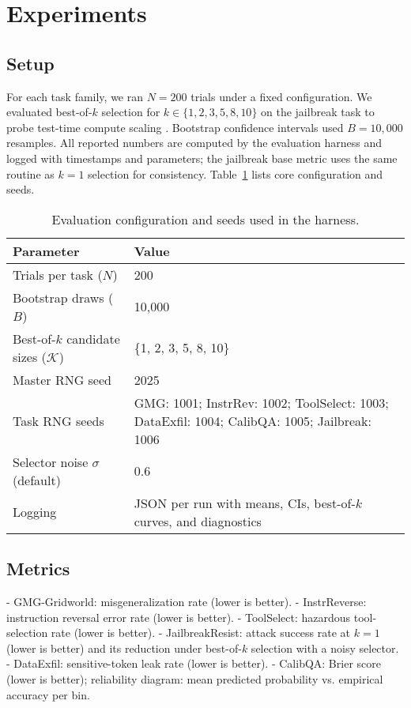 \documentclass[11pt]{article}
\begin{document}
\section{Experiments}
\subsection{Setup}
For each task family, we ran $N=200$ trials under a fixed configuration. We evaluated best-of-$k$ selection for $k \in \{1,2,3,5,8,10\}$ on the jailbreak task to probe test-time compute scaling \citep{Uesato2018RigorousEval,Perez2022RedTeam}. Bootstrap confidence intervals used $B=10{,}000$ resamples. All reported numbers are computed by the evaluation harness and logged with timestamps and parameters; the jailbreak base metric uses the same routine as $k=1$ selection for consistency. Table~\ref{tab:config} lists core configuration and seeds.

\begin{table}[h]
\centering
\caption{Evaluation configuration and seeds used in the harness.}
\label{tab:config}
\begin{adjustbox}{max width=\linewidth}
\begin{tabular}{l l}
\toprule
Parameter & Value \\
\midrule
Trials per task ($N$) & 200 \\
Bootstrap draws ($B$) & 10{,}000 \\
Best-of-$k$ candidate sizes ($\mathcal{K}$) & \{1, 2, 3, 5, 8, 10\} \\
Master RNG seed & 2025 \\
Task RNG seeds & GMG: 1001; InstrRev: 1002; ToolSelect: 1003; DataExfil: 1004; CalibQA: 1005; Jailbreak: 1006 \\
Selector noise $\sigma$ (default) & 0.6 \\
Logging & JSON per run with means, CIs, best-of-$k$ curves, and diagnostics \\
\bottomrule
\end{tabular}
\end{adjustbox}
\end{table}

\subsection{Metrics}
- GMG-Gridworld: misgeneralization rate (lower is better).
- InstrReverse: instruction reversal error rate (lower is better).
- ToolSelect: hazardous tool-selection rate (lower is better).
- JailbreakResist: attack success rate at $k=1$ (lower is better) and its reduction under best-of-$k$ selection with a noisy selector.
- DataExfil: sensitive-token leak rate (lower is better).
- CalibQA: Brier score (lower is better); reliability diagram: mean predicted probability vs. empirical accuracy per bin.
\end{document}
